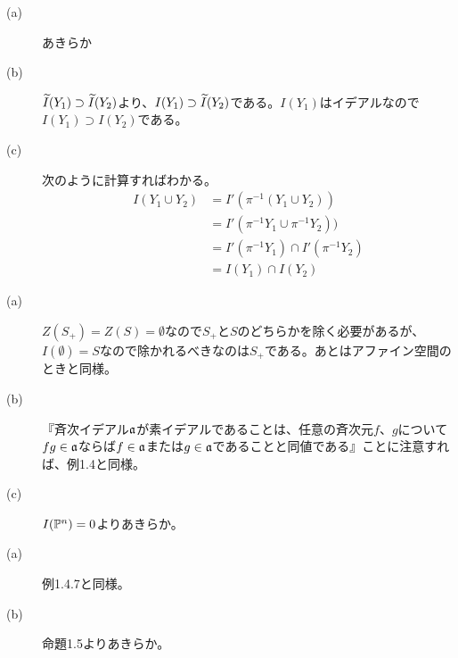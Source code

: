\begin{description}
  \item[(a)] あきらか
  \item[(b)] ${\wt I}(Y_1) \supset {\wt I}(Y_2)$より、$I(Y_1) \supset {\wt I}(Y_2)$である。$I(Y_1)$はイデアルなので$I(Y_1) \supset I(Y_2)$である。
  \item[(c)] 次のように計算すればわかる。
  \begin{align*}
    I(Y_1 \cup Y_2) &= I'(\pi^{-1}(Y_1 \cup Y_2)) \\
    &= I'(\pi^{-1}Y_1 \cup \pi^{-1}Y_2)) \\
    &= I'(\pi^{-1}Y_1) \cap I'(\pi^{-1}Y_2) \\
    &= I(Y_1) \cap I(Y_2)
  \end{align*}
\end{description}


\begin{description}
  \item[(a)]$Z(S_+) = Z(S)= \emptyset$なので$S_+$と$S$のどちらかを除く必要があるが、$I(\emptyset)= S$なので除かれるべきなのは$S_+$である。あとはアファイン空間のときと同様。
  \item[(b)]『斉次イデアル$\fraka$が素イデアルであることは、任意の斉次元$f$、$g$について$fg \in \fraka$ならば$f \in \fraka$または$g \in \fraka$であることと同値である』ことに注意すれば、例1.4と同様。
  \item[(c)]$I(\P^n)=0$よりあきらか。
\end{description}



\begin{description}
  \item[(a)]例1.4.7と同様。
  \item[(b)]命題1.5よりあきらか。
\end{description}






